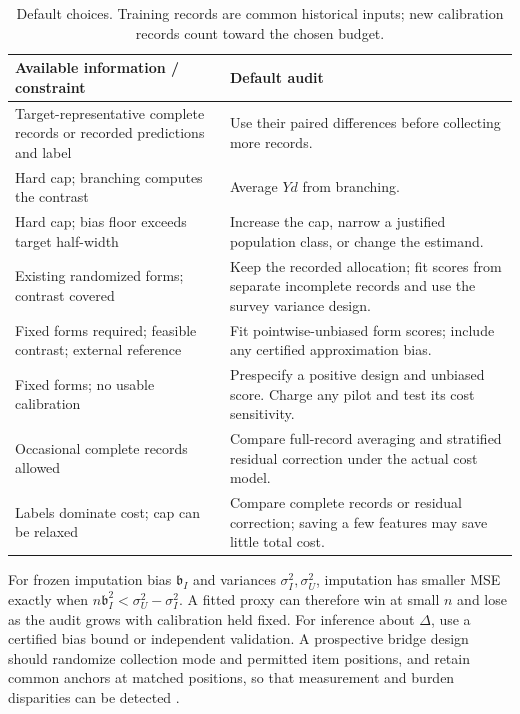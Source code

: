 \begin{table}[h]
\centering
\caption{Default choices. Training records are common historical inputs; new calibration records count toward the chosen budget.}
\label{tab:decision}
\small
\begin{tabular}{p{}p{}}
\toprule
Available information / constraint & Default audit \\
\midrule
Target-representative complete records or recorded predictions and label & Use their paired differences before collecting more records. \\
Hard cap; branching computes the contrast & Average $Yd$ from branching. \\
Hard cap; bias floor exceeds target half-width & Increase the cap, narrow a justified population class, or change the estimand. \\
Existing randomized forms; contrast covered & Keep the recorded allocation; fit scores from separate incomplete records and use the survey variance design. \\
Fixed forms required; feasible contrast; external reference & Fit pointwise-unbiased form scores; include any certified approximation bias. \\
Fixed forms; no usable calibration & Prespecify a positive design and unbiased score. Charge any pilot and test its cost sensitivity. \\
Occasional complete records allowed & Compare full-record averaging and stratified residual correction under the actual cost model. \\
Labels dominate cost; cap can be relaxed & Compare complete records or residual correction; saving a few features may save little total cost. \\
\bottomrule
\end{tabular}
\end{table}

For frozen imputation bias $\mathfrak b_I$ and variances $\sigma_I^2,\sigma_U^2$, imputation has smaller MSE exactly when $n\mathfrak b_I^2<\sigma_U^2-\sigma_I^2$. A fitted proxy can therefore win at small $n$ and lose as the audit grows with calibration held fixed. For inference about $\Delta$, use a certified bias bound or independent validation. A prospective bridge design should randomize collection mode and permitted item positions, and retain common anchors at matched positions, so that measurement and burden disparities can be detected \citep{schuman1981}.
